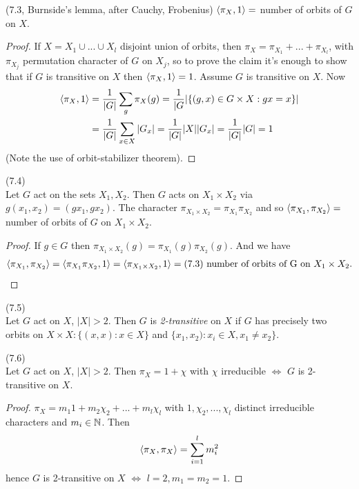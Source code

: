 \documentclass[a4paper]{article}
\begin{document}
\begin{lemma} (7.3, Burnside's lemma, after Cauchy, Frobenius)
$\langle \pi_X, 1\rangle = $ number of orbits of $G$ on $X$.
\begin{proof}
If $X = X_1 \cup ... \cup X_l$ disjoint union of orbits, then $\pi_X = \pi_{X_1}+...+\pi_{X_l}$, with $\pi_{X_j}$ permutation character of $G$ on $X_j$, so to prove the claim it's enough to show that if $G$ is transitive on $X$ then $\langle \pi_X,1\rangle = 1$. Assume $G$ is transitive on $X$. Now
\begin{equation*}
\begin{aligned}
\langle \pi_X,1\rangle &= \frac{1}{|G|} \sum_g \pi_X(g) = \frac{1}{|G} |\{(g,x) \in G \times X: gx = x\}|\\
&= \frac{1}{|G|} \sum_{x \in X} |G_x|=\frac{1}{|G|}|X||G_x| = \frac{1}{|G|}|G| = 1
\end{aligned}
\end{equation*}
(Note the use of orbit-stabilizer theorem).
\end{proof}
\end{lemma}

\begin{lemma} (7.4)\\
Let $G$ act on the sets $X_1,X_2$. Then $G$ acts on $X_1 \times X_2$ via $g(x_1,x_2) = (gx_1,gx_2)$. The character $\pi_{X_1 \times X_2} = \pi_{X_1} \pi_{X_2}$ and so $\langle \pi_{X_1} ,\pi_{X_2}\rangle =$ number of orbits of $G$ on $X_1 \times X_2$.
\begin{proof}
If $g \in G$ then $\pi_{X_1 \times X_2} (g) = \pi_{X_1} (g) \pi_{X_2}(g)$. And we have
\begin{equation*}
\begin{aligned}
\langle \pi_{X_1},\pi_{X_2} \rangle = \langle \pi_{X_1}\pi_{X_2},1\rangle = \langle \pi_{X_1 \times X_2} ,1\rangle = (7.3) \text{ number of orbits of G on } X_1 \times X_2.
\end{aligned}
\end{equation*}
\end{proof}
\end{lemma}

\begin{defi} (7.5)\\
Let $G$ act on $X$, $|X| > 2$. Then $G$ is \emph{2-transitive} on $X$ if $G$ has precisely two orbits on $X \times X: \{(x,x):x \in X\}$ and $\{x_1,x_2) : x_i \in X,x_1 \neq x_2\}$.
\end{defi}

\begin{lemma} (7.6)\\
Let $G$ act on $X$, $|X|>2$. Then $\pi_X = 1+\chi$ with $\chi$ irreducible $\iff$ $G$ is 2-transitive on $X$.
\begin{proof}
$\pi_X = m_1 1 + m_2 \chi_2 + ... + m_l \chi_l$ with $1,\chi_2,...,\chi_l$ distinct irreducible characters and $m_i \in \mathbb{N}$. Then
\begin{equation*}
\begin{aligned}
\langle \pi_X,\pi_X\rangle = \sum_{i=1}^l m_i^2
\end{aligned}
\end{equation*}
hence $G$ is 2-transitive on $X$ $\iff$ $l=2,m_1=m_2=1$.
\end{proof}
\end{lemma}
\end{document}

